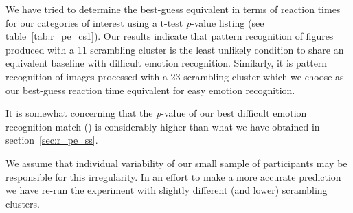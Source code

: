 	    We have tried to determine the best-guess equivalent in terms of reaction times for our categories of interest using a t-test \textit{p}-value listing (see table~\ref{tab:r_pe_cs1}).
	    Our results indicate that pattern recognition of figures produced with a \SI{11}{\pixel} scrambling cluster is the least unlikely condition to share an equivalent baseline with difficult emotion recognition.
	    Similarly, it is pattern recognition of images processed with a \SI{23}{\pixel} scrambling cluster which we choose as our best-guess reaction time equivalent for easy emotion recognition.
	    
	    It is somewhat concerning that the \textit{p}-value of our best difficult emotion recognition match () is considerably higher than what we have obtained in section~\ref{sec:r_pe_ss}.
	    
	    We assume that individual variability of our small sample of participants may be responsible for this irregularity.
	    In an effort to make a more accurate prediction we have re-run the experiment with slightly different (and lower) scrambling clusters.
	    
